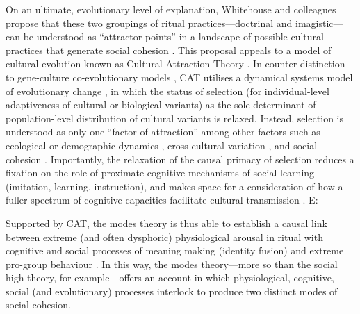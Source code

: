 \begin{CJK}{UTF8}{gbsn}
On an ultimate, evolutionary level of explanation, Whitehouse and colleagues propose that these two groupings of ritual practices---doctrinal and imagistic---can be understood as ``attractor points'' in a landscape of possible cultural practices that generate social cohesion \citep{Atkinson2011,Whitehouse2014}.  This proposal appeals to a model of cultural evolution known as Cultural Attraction Theory \citep[hereafter CAT; an extension of Sperber's ``epidemiology of representations,'' see][]{Sperber1996,Claidiere2007,Claidiere2014}.  In counter distinction to gene-culture co-evolutionary models \citep[, which largely adhere to the MES paradigm, including Darwinian natural selection as the sole determinant of genetic and cultural evolution see][]{Acerbi2015}, CAT utilises a dynamical systems model of evolutionary change \citep[known generally as ``evolutionary systems theory,'' cf.][]{Badcock2012}, in which the status of selection (for individual-level adaptiveness of cultural or biological variants) as the sole determinant of population-level distribution of cultural variants is relaxed.  Instead, selection is understood as only one ``factor of attraction'' \citep{Claidiere2014} among other factors such as ecological or demographic dynamics \citep[such as availability of resources and population size and density, cf.][]{Henrich2004,Powerll2009}, cross-cultural variation \citep{Mesoudi2015}, and social cohesion \citep{Heyes2011}.  Importantly, the relaxation of the causal primacy of selection reduces a fixation on the role of proximate cognitive mechanisms of social learning (imitation, learning, instruction), and makes space for a consideration of how a fuller spectrum of cognitive capacities facilitate cultural transmission \citep{Acerbi2015}.  E:

Supported by CAT, the modes theory is thus able to establish a causal link between extreme (and often dysphoric) physiological arousal in ritual with cognitive and social processes of meaning making (identity fusion) and extreme pro-group behaviour \citep{Whitehouse2014,Whitehouse2017}.  In this way, the modes theory---more so than the social high theory, for example---offers an account in which physiological, cognitive, social (and evolutionary) processes interlock to produce two distinct modes of social cohesion.




\end{CJK}
